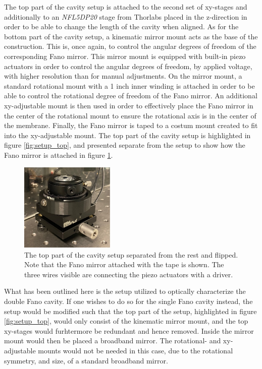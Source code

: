 The top part of the cavity setup is attached to the second set of xy-stages and additionally to an \emph{NFL5DP20} stage from Thorlabs\cite{z_stage} placed in the z-direction in order to be able to change the length of the cavity when aligned. As for the bottom part of the cavity setup, a kinematic mirror mount acts as the base of the construction. This is, once again, to control the angular degrees of freedom of the corresponding Fano mirror. This mirror mount is equipped with built-in piezo actuators in order to control the angular degrees of freedom, by applied voltage, with higher resolution than for manual adjustments. On the mirror mount, a standard rotational mount with a 1 inch inner winding is attached in order to be able to control the rotational degree of freedom of the Fano mirror. An additional xy-adjustable mount is then used in order to effectively place the Fano mirror in the center of the rotational mount to ensure the rotational axis is in the center of the membrane. Finally, the Fano mirror is taped to a costum mount created to fit into the xy-adjustable mount. The top part of the cavity setup is highlighted in figure \ref{fig:setup_top}, and presented separate from the setup to show how the Fano mirror is attached in figure \ref{fig:cavity_setup_top_separate_pic}.

\begin{figure}[h!]
    \centering
    \includegraphics[width=0.4\textwidth]{figures/cavity_setup_top_separate_pic.pdf}
    \caption{The top part of the cavity setup separated from the rest and flipped. Note that the Fano mirror attached with the tape is shown. The three wires visible are connecting the piezo actuators with a driver.}
    \label{fig:cavity_setup_top_separate_pic}    
\end{figure}

What has been outlined here is the setup utilized to optically characterize the double Fano cavity. If one wishes to do so for the single Fano cavity instead, the setup would be modified such that the top part of the setup, highlighted in figure \ref{fig:setup_top}, would only consist of the kinematic mirror mount, and the top xy-stages would furhtermore be redundant and hence removed. Inside the mirror mount would then be placed a broadband mirror. The rotational- and xy-adjustable mounts would not be needed in this case, due to the rotational symmetry, and size, of a standard broadband mirror.

